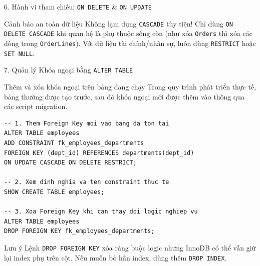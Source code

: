 \documentclass[aspectratio=169,11pt]{beamer}
\newcommand{\smallgap}{\vspace{0.2em}}
\begin{document}
\begin{frame}{6. Hành vi tham chiếu: \texttt{ON DELETE} \& \texttt{ON UPDATE}}
\begin{center}
\end{center}

\smallgap
\begin{alertblock}{Cảnh báo an toàn dữ liệu}
  Không lạm dụng \texttt{CASCADE} tùy tiện! Chỉ dùng \texttt{ON DELETE CASCADE} khi quan hệ là phụ thuộc sống còn (như xóa \texttt{Orders} thì xóa các dòng trong \texttt{OrderLines}). Với dữ liệu tài chính/nhân sự, luôn dùng \texttt{RESTRICT} hoặc \texttt{SET NULL}.
\end{alertblock}
\end{frame}

\begin{frame}[fragile]{7. Quản lý Khóa ngoại bằng \texttt{ALTER TABLE}}
\begin{block}{Thêm và xóa khóa ngoại trên bảng đang chạy}
  Trong quy trình phát triển thực tế, bảng thường được tạo trước, sau đó khóa ngoại mới được thêm vào thông qua các script migration.
\end{block}

\begin{lstlisting}
-- 1. Them Foreign Key moi vao bang da ton tai
ALTER TABLE employees
ADD CONSTRAINT fk_employees_departments
FOREIGN KEY (dept_id) REFERENCES departments(dept_id)
ON UPDATE CASCADE ON DELETE RESTRICT;

-- 2. Xem dinh nghia va ten constraint thuc te
SHOW CREATE TABLE employees;

-- 3. Xoa Foreign Key khi can thay doi logic nghiep vu
ALTER TABLE employees
DROP FOREIGN KEY fk_employees_departments;
\end{lstlisting}

\begin{exampleblock}{Lưu ý}
  Lệnh \texttt{DROP FOREIGN KEY} xóa ràng buộc logic nhưng InnoDB có thể vẫn giữ lại index phụ trên cột. Nếu muốn bỏ hẳn index, dùng thêm \texttt{DROP INDEX}.
\end{exampleblock}
\end{frame}
\end{document}
